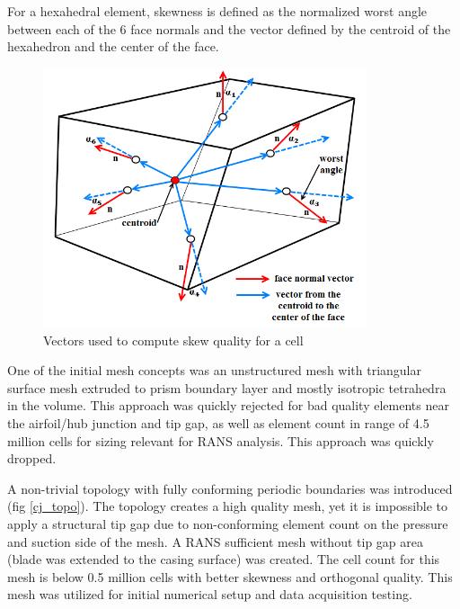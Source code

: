 For a hexahedral element, skewness is defined as the normalized worst angle between each of the 6 face normals and the vector defined by the centroid of the hexahedron and the center of the face.

\begin{figure}[ht!]
\centering %
\includegraphics[width=0.85\textwidth]{Pictures/skew.png}
\caption{Vectors used to compute skew quality for a cell}
\label{skew}
\end{figure}



One of the initial mesh concepts was an unstructured mesh with triangular surface mesh extruded to prism boundary layer and mostly isotropic tetrahedra in the volume. This approach was quickly rejected for bad quality elements near the airfoil/hub junction and tip gap, as well as element count in range of 4.5 million cells for sizing relevant for RANS analysis. This approach was quickly dropped.

A non-trivial topology with fully conforming periodic boundaries was introduced (fig \ref{cj_topo}). The topology creates a high quality mesh, yet it is impossible to apply a structural tip gap due to non-conforming element count on the pressure and suction side of the mesh. A RANS sufficient mesh without tip gap area (blade was extended to the casing surface) was created. The cell count for this mesh is below 0.5 million cells with better skewness and orthogonal quality. This mesh was utilized for initial numerical setup and data acquisition testing.

